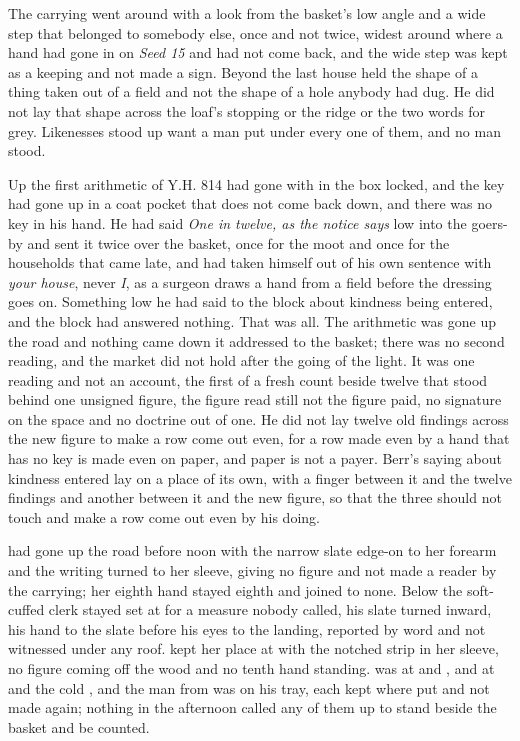The carrying went around  with a look from the basket's low angle and a wide step that belonged to somebody else, once and not twice, widest around  where a hand had gone in on \emph{Seed 15} and had not come back, and the wide step was kept as a keeping and not made a sign. Beyond the last house  held the shape of a thing taken out of a field and not the shape of a hole anybody had dug. He did not lay that shape across the loaf's stopping or the ridge or the two words for grey. Likenesses stood up want a man put under every one of them, and no man stood.

Up  the first arithmetic of Y.H. 814 had gone with  in the box locked, and the key had gone up in a coat pocket that does not come back down, and there was no key in his hand. He had said \emph{One in twelve, as the notice says} low into the goers-by and sent it twice over the basket, once for the moot and once for the households that came late, and had taken himself out of his own sentence with \emph{your house}, never \emph{I}, as a surgeon draws a hand from a field before the dressing goes on. Something low he had said to the block about kindness being entered, and the block had answered nothing. That was all. The arithmetic was gone up the road and nothing came down it addressed to the basket; there was no second reading, and the market did not hold after the going of the light. It was one reading and not an account, the first of a fresh count beside twelve that stood behind one unsigned figure, the figure read still not the figure paid, no signature on the space and no doctrine out of one. He did not lay twelve old findings across the new figure to make a row come out even, for a row made even by a hand that has no key is made even on paper, and paper is not a payer. Berr's saying about kindness entered lay on a place of its own, with a finger between it and the twelve findings and another between it and the new figure, so that the three should not touch and make a row come out even by his doing.

 had gone up the road before noon with the narrow slate edge-on to her forearm and the writing turned to her sleeve, giving no figure and not made a reader by the carrying; her eighth hand stayed eighth and joined to none. Below  the soft-cuffed clerk stayed set at  for a measure nobody called, his slate turned inward, his hand to the slate before his eyes to the landing, reported by word and not witnessed under any roof.  kept her place at  with the notched strip in her sleeve, no figure coming off the wood and no tenth hand standing.  was at  and , and  at  and the cold , and the man from  was on his tray, each kept where put and not made again; nothing in the afternoon called any of them up to stand beside the basket and be counted.

